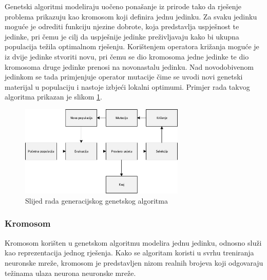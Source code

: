 \documentclass[times, utf8, zavrsni, numeric]{fer}
\begin{document}
Genetski algoritmi modeliraju uočeno ponašanje iz prirode tako da rješenje problema prikazuju kao kromosom koji definira jednu jedinku.
Za svaku jedinku moguće je odrediti funkciju njezine dobrote, koja predstavlja uspješnost te jedinke, pri čemu je cilj da uspješnije jedinke preživljavaju kako bi ukupna populacija težila optimalnom rješenju.
Korištenjem operatora križanja moguće je iz dvije jedinke stvoriti novu, pri čemu se dio kromosoma jedne jedinke te dio kromosoma druge jedinke prenosi na novonastalu jedinku.
Nad novodobivenom jedinkom se tada primjenjuje operator mutacije čime se uvodi novi genetski materijal u populaciju i nastoje izbjeći lokalni optimumi.
Primjer rada takvog algoritma prikazan je slikom \ref{fig:gen}.

\begin{figure}[ht!]
    \centering
    \includegraphics[width=0.7\textwidth]{Images/Gen.pdf}
    \captionsetup{justification=centering}
    \caption{Slijed rada generacijskog genetskog algoritma \cite{optjava}}
    \label{fig:gen}
\end{figure}

\subsubsection{Kromosom}
Kromosom korišten u genetskom algoritmu modelira jednu jedinku, odnosno služi kao reprezentacija jednog rješenja.
Kako se algoritam koristi u svrhu treniranja neuronske mreže, kromosom je predstavljen nizom realnih brojeva koji odgovaraju težinama ulaza neurona neuronske mreže.
\end{document}
